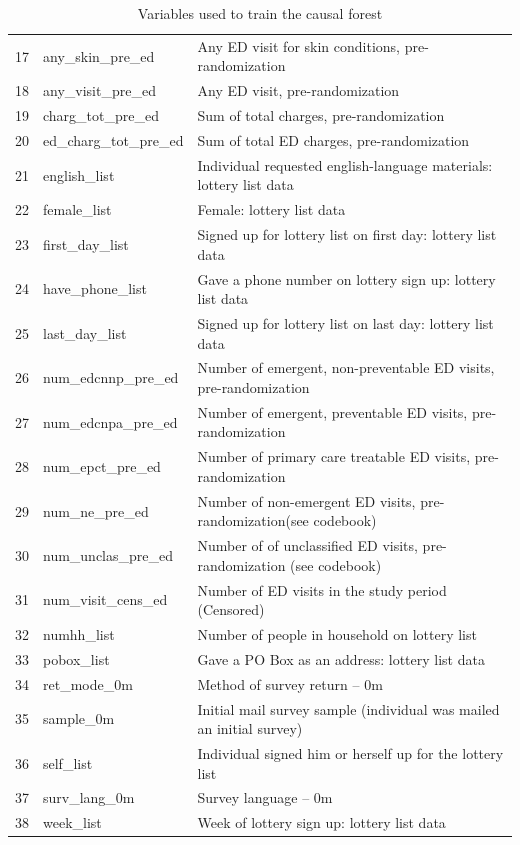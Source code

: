 \begin{table}[ht]
{\begin{tabular}{rll}
    17 & any\_skin\_pre\_ed & Any ED visit for skin conditions, pre-randomization \\ 
    18 & any\_visit\_pre\_ed & Any ED visit, pre-randomization \\ 
    19 & charg\_tot\_pre\_ed & Sum of total charges, pre-randomization \\ 
    20 & ed\_charg\_tot\_pre\_ed & Sum of total ED charges, pre-randomization \\ 
    21 & english\_list & Individual requested english-language materials: lottery list data \\ 
    22 & female\_list & Female: lottery list data \\ 
    23 & first\_day\_list & Signed up for lottery list on first day: lottery list data \\ 
    24 & have\_phone\_list & Gave a phone number on lottery sign up: lottery list data \\ 
    25 & last\_day\_list & Signed up for lottery list on last day: lottery list data \\ 
    26 & num\_edcnnp\_pre\_ed & Number of emergent, non-preventable ED visits, pre-randomization \\ 
    27 & num\_edcnpa\_pre\_ed & Number of emergent, preventable ED visits, pre-randomization \\ 
    28 & num\_epct\_pre\_ed & Number of primary care treatable ED visits, pre-randomization \\ 
    29 & num\_ne\_pre\_ed & Number of non-emergent ED visits, pre-randomization(see codebook) \\ 
    30 & num\_unclas\_pre\_ed & Number of of unclassified ED visits, pre-randomization (see codebook) \\ 
    31 & num\_visit\_cens\_ed & Number of ED visits in the study period (Censored) \\ 
    32 & numhh\_list & Number of people in household on lottery list \\ 
    33 & pobox\_list & Gave a PO Box as an address: lottery list data \\ 
    34 & ret\_mode\_0m & Method of survey return -- 0m \\ 
    35 & sample\_0m & Initial mail survey sample (individual was mailed an initial survey) \\ 
    36 & self\_list & Individual signed him or herself up for the lottery list \\ 
    37 & surv\_lang\_0m & Survey language -- 0m \\ 
    38 & week\_list & Week of lottery sign up: lottery list data \\ 
     \hline
  \end{tabular}
  }
  \caption{Variables used to train the causal forest} 
  \label{tab:features}
  \end{table}